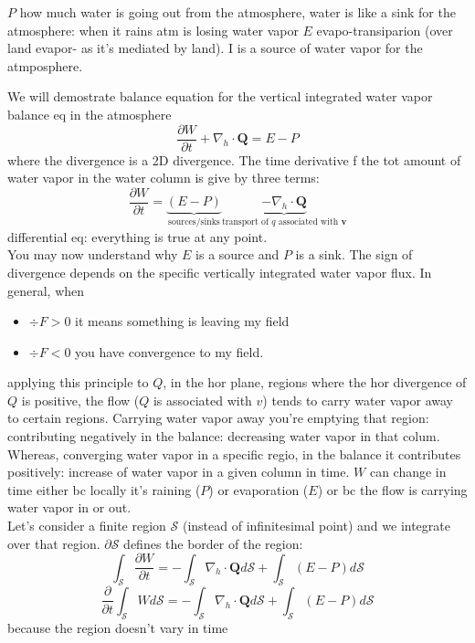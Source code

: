 $P$ how much water is going out from the atmosphere, water is like a sink for the atmosphere: when it rains atm is losing water vapor
$E$ evapo-transiparion (over land evapor- as it's mediated by land). I is a source of water vapor for the atmposphere. 

We will demostrate balance equation for the vertical integrated water vapor balance eq in the atmosphere
\begin{equation}\label{eq.W}
    \frac{\partial W}{\partial t}+\nabla_h\cdot \mathbf{Q}=E-P
\end{equation}
where the divergence is a 2D divergence. The time derivative f the tot amount of water vapor in the water column is give by three terms: 
\[\frac{\partial W}{\partial t}=\underbrace{(E-P)}_{\text{sources/sinks}}\underbrace{-\nabla_h\cdot \mathbf{Q}}_{\text{transport of $q$ associated with $\mathbf{v}$}}\]
differential eq: everything is true at any point.\\




You may now understand why $E$ is a source and $P$ is a sink. The sign of divergence depends on the specific vertically integrated water vapor flux. In general, when 
\begin{itemize}
    \item $\div{F}>0$ it means something is leaving my field
    \item $\div{F}<0$ you have convergence to my field.
\end{itemize}
applying this principle to $Q$, in the hor plane, regions where the hor divergence of $Q$ is positive, the flow ($Q$ is associated with $v$) tends to carry water vapor away to certain regions. Carrying water vapor away you're emptying that region: contributing negatively in the balance: decreasing water vapor in that colum. Whereas, converging water vapor in a specific regio, in the balance it contributes positively: increase of water vapor in a given column in time. $W$ can change in time either bc locally it's raining ($P$) or evaporation ($E$) or bc the flow is carrying water vapor in or out. \\


Let's consider a finite region $\mathcal{S}$ (instead of infinitesimal point) and we integrate over that region. $\partial\mathcal{S}$ defines the border of the region:
\[\int_{\mathcal{S}}\frac{\partial W}{\partial t}=-\int_{\mathcal{S}}\nabla_h\cdot\mathbf{Q}d\mathcal{S}+\int_{\mathcal{S}}(E-P)d\mathcal{S}\]
\[\frac{\partial}{\partial t}\int_{\mathcal{S}}Wd\mathcal{S}=-\int_{\mathcal{S}}\nabla_h\cdot\mathbf{Q}d\mathcal{S}+\int_{\mathcal{S}}(E-P)d\mathcal{S}\]
because the region doesn't vary in time

